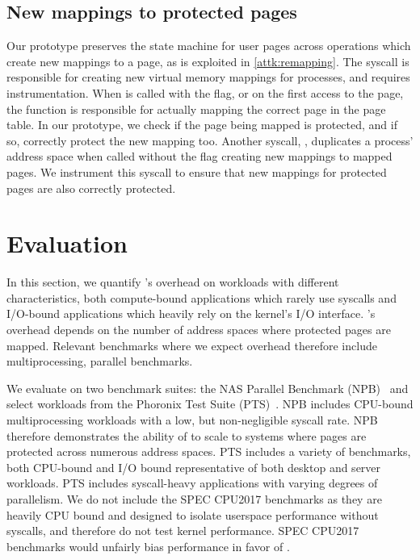 \documentclass[letterpaper,twocolumn,10pt, anonymous]{article}
\begin{document}

\subsection{New mappings to protected pages}

Our \tiktok prototype preserves the state machine for user pages
across operations which create new mappings to a page, as is 
exploited in \autoref{attk:remapping}.
The  syscall is responsible for creating new virtual
memory mappings for processes, and requires instrumentation.
When  is called with the  flag, or 
on the first access to the page, the  function 
is responsible for actually mapping the correct page in the 
page table. 
In our prototype, we check if the page being mapped is protected, 
and if so, correctly protect the new mapping too.
Another syscall, , duplicates a process' address space
when called without the  flag creating new mappings
to mapped pages. 
We instrument this syscall to ensure that new mappings for protected 
pages are also correctly protected.


\section{Evaluation}

In this section, we quantify \tiktok's overhead on workloads 
with different characteristics, both compute-bound applications
which rarely use syscalls and I/O-bound applications which 
heavily rely on the kernel's I/O interface.
\tiktok's overhead depends on the number of address spaces 
where protected pages are mapped. 
Relevant benchmarks where we expect overhead therefore include multiprocessing,
parallel benchmarks.

We evaluate \tiktok on two benchmark suites: the NAS Parallel 
Benchmark (NPB)~\cite{npb} and select workloads from the 
Phoronix Test Suite (PTS)~\cite{pts}. 
NPB includes CPU-bound multiprocessing workloads with a 
low, but non-negligible syscall rate. 
NPB therefore demonstrates the ability of \tiktok to 
scale to systems where pages are protected across numerous 
address spaces.
PTS includes a variety of benchmarks, both CPU-bound and 
I/O bound representative of both desktop and server workloads.
PTS includes syscall-heavy applications with varying degrees 
of parallelism.
We do not include the SPEC CPU2017 benchmarks
as they are heavily CPU bound and designed to isolate userspace 
performance without syscalls, and therefore do not test kernel 
performance. SPEC CPU2017 benchmarks would unfairly bias performance in favor of
\tiktok.
\end{document}
